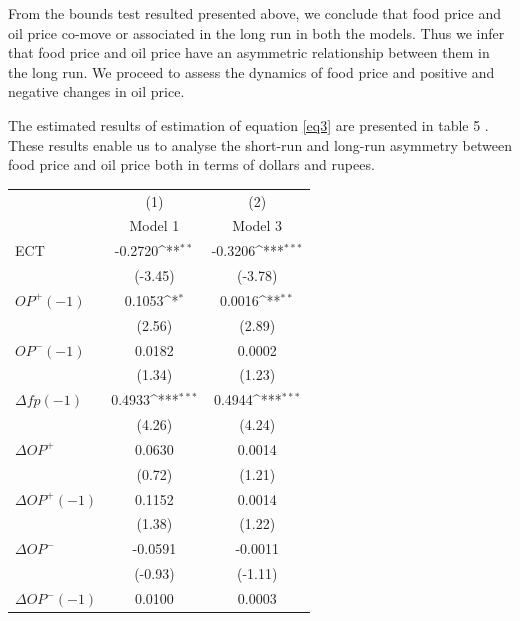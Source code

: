 \documentclass[a4paper,12pt]{article}
\begin{document}
From the bounds test resulted presented above, we conclude that food price and oil price co-move or associated in the long run in both the models. Thus we infer that food price and oil price have an asymmetric relationship between them in the long run. We proceed to assess the dynamics of food price and positive and negative changes in oil price. 

The estimated results of estimation of equation \eqref{eq3} are presented in table 5 . These results enable us to analyse the short-run and long-run asymmetry between food price and oil price both in terms of dollars and rupees. 
\FloatBarrier
\begin{table}[ht]
	\centering
	\renewcommand{\arraystretch}{1.23}
	
		
		\def\sym#1{\ifmmode^{#1}\else\(^{#1}\)\fi}
		\begin{tabular}{l*{2}{c}}
			\hline
			&\multicolumn{1}{c}{(1)}&\multicolumn{1}{c}{(2)}\\
			&\multicolumn{1}{c}{Model 1}&\multicolumn{1}{c}{Model 3}\\
			\hline
			ECT         &     -0.2720\sym{**} &     -0.3206\sym{***}\\
			&     (-3.45)         &     (-3.78)         \\
			$OP^+(-1)$      &      0.1053\sym{*}  &      0.0016\sym{**} \\
			&      (2.56)         &      (2.89)         \\
			$OP^-(-1)$      &      0.0182         &      0.0002         \\
			&      (1.34)         &      (1.23)         \\
			$\Delta fp(-1)$       &      0.4933\sym{***}&      0.4944\sym{***}\\
			&      (4.26)         &      (4.24)         \\
			$\Delta OP^+$      &      0.0630         &      0.0014         \\
			&      (0.72)         &      (1.21)         \\
			$\Delta OP^+(-1)$     &      0.1152         &      0.0014         \\
			&      (1.38)         &      (1.22)         \\
			$\Delta OP^-$       &     -0.0591         &     -0.0011         \\
			&     (-0.93)         &     (-1.11)         \\
			$\Delta OP^-(-1)$     &      0.0100         &      0.0003         \\

\end{tabular}
\end{table}
\end{document}
